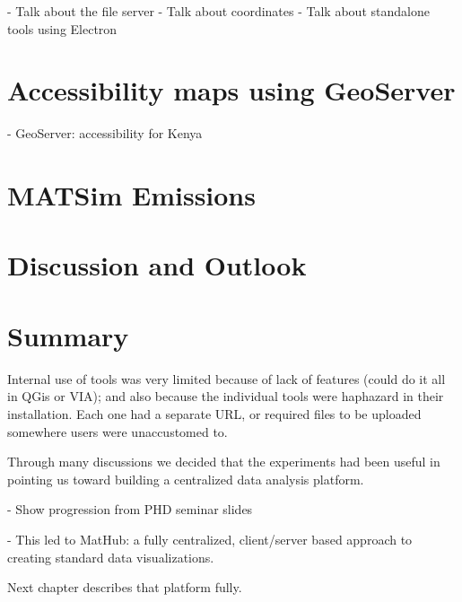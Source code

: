 - Talk about the file server
- Talk about coordinates
- Talk about standalone tools using Electron

\hypertarget{server-experiments-geoserver}{%
\section{Accessibility maps using GeoServer}\label{server-experiments-geoserver}}

- GeoServer: accessibility for Kenya

\hypertarget{server-experiments-emissions}{%
\section{MATSim Emissions}\label{server-experiments-emissions}}

\hypertarget{server-experiments-findings}{%
\section{Discussion and Outlook}\label{server-experiments-findings}}

\hypertarget{server-experiments-summary}{%
\section{Summary}\label{server-experiments-summary}}


Internal use of tools was very limited because of lack of features (could do it all in QGis or VIA); and also because the individual tools were haphazard in their installation. Each one had a separate URL, or required files to be uploaded somewhere users were unaccustomed to.

Through many discussions we decided that the experiments had been useful in pointing us toward building a centralized data analysis platform.

- Show progression from PHD seminar slides

- This led to MatHub: a fully centralized, client/server based approach to creating standard data visualizations.

Next chapter describes that platform fully.


